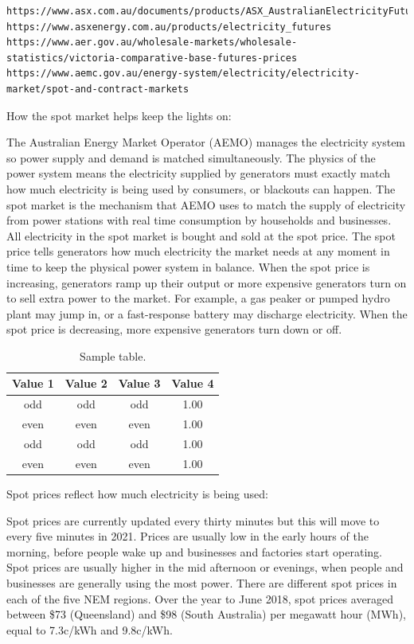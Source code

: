 \documentclass[12pt]{article}
\begin{document}
\begin{flushleft}
\begin{verbatim}
https://www.asx.com.au/documents/products/ASX_AustralianElectricityFuturesandOptions_ContractSpecifications_July2015.pdf
https://www.asxenergy.com.au/products/electricity_futures
https://www.aer.gov.au/wholesale-markets/wholesale-statistics/victoria-comparative-base-futures-prices
https://www.aemc.gov.au/energy-system/electricity/electricity-market/spot-and-contract-markets
\end{verbatim}
How the spot market helps keep the lights on:\par
The Australian Energy Market Operator (AEMO) manages the electricity system so power supply and demand is matched simultaneously. The physics of the power system means the electricity supplied by generators must exactly match how much electricity is being used by consumers, or blackouts can happen. The spot market is the mechanism that AEMO uses to match the supply of electricity from power stations with real time consumption by households and businesses. All electricity in the spot market is bought and sold at the spot price. The spot price tells generators how much electricity the market needs at any moment in time to keep the physical power system in balance. When the spot price is increasing, generators  ramp up their output or more expensive generators turn on to sell extra power to the market. For example, a gas peaker or pumped hydro plant may jump in, or a fast-response battery may discharge electricity. When the spot price is decreasing, more expensive generators turn down or off.\par
\begin{table}[!h]
\centering
\caption{Sample table.}
\begin{tabular}{cccc}
\toprule
Value 1 & Value 2 & Value 3 & Value 4\\
\midrule
 odd     & odd   & odd & 1.00 \\
 even    & even  & even& 1.00 \\
 odd     & odd   & odd & 1.00 \\
 even    & even  & even& 1.00 \\
\bottomrule
\end{tabular}
\end{table}
Spot prices reflect how much electricity is being used:\par
Spot prices are currently updated every thirty minutes but this will move to every five minutes in 2021. Prices are usually low in the early hours of the morning, before people wake up and businesses and factories start operating. Spot prices are usually higher in the mid afternoon or evenings, when people and businesses are generally using the most power. There are different spot prices in each of the five NEM regions. Over the year to June 2018, spot prices averaged between \$73 (Queensland) and \$98 (South Australia) per megawatt hour (MWh), equal to 7.3c/kWh and 9.8c/kWh.
\end{flushleft}
\newpage
\end{document}
